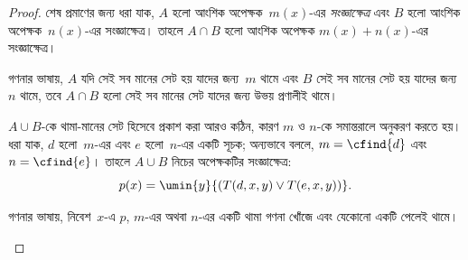 \documentclass[../../../include/open-logic-section]{subfiles}
\begin{document}
\begin{proof}
শেষ প্রমাণের জন্য ধরা যাক, $A$ হলো আংশিক অপেক্ষক~$m(x)$-এর
\emph{সংজ্ঞাক্ষেত্র} এবং $B$ হলো আংশিক অপেক্ষক~$n(x)$-এর সংজ্ঞাক্ষেত্র।
তাহলে $A \cap B$ হলো আংশিক অপেক্ষক $m(x) + n(x)$-এর সংজ্ঞাক্ষেত্র।

\begin{explain}
গণনার ভাষায়, $A$ যদি সেই সব মানের সেট হয় যাদের জন্য~$m$ থামে এবং
$B$ সেই সব মানের সেট হয় যাদের জন্য~$n$ থামে, তবে $A \cap B$ হলো সেই
সব মানের সেট যাদের জন্য উভয় প্রণালীই থামে।
\end{explain}

$A \cup B$-কে থামা-মানের সেট হিসেবে প্রকাশ করা আরও কঠিন, কারণ $m$ ও
$n$-কে সমান্তরালে অনুকরণ করতে হয়। ধরা যাক, $d$ হলো~$m$-এর এবং $e$
হলো~$n$-এর একটি সূচক; অন্যভাবে বললে, $m = \cfind{d}$ এবং
$n = \cfind{e}$। তাহলে $A \cup B$ নিচের অপেক্ষকটির সংজ্ঞাক্ষেত্র:
\[
p(x) = \umin{y}{(T(d,x,y) \lor T(e,x,y))}.
\]
\begin{explain}
গণনার ভাষায়, নিবেশ~$x$-এ $p$, $m$-এর অথবা $n$-এর একটি থামা গণনা
খোঁজে এবং যেকোনো একটি পেলেই থামে।
\end{explain}
\end{proof}
\end{document}
